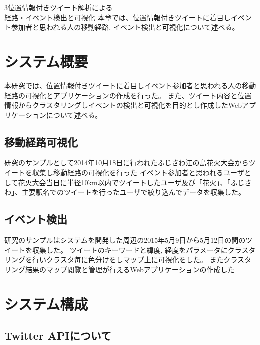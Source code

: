 \chapterhead
{3}{位置情報付きツイート解析による\\
経路・イベント検出と可視化}
{本章では、位置情報付きツイートに着目しイベント参加者と思われる人の移動経路, イベント検出と可視化について述べる。}


\section{システム概要}
本研究では、位置情報付きツイートに着目しイベント参加者と思われる人の移動経路の可視化とアプリケーションの作成を行った。
また、ツイート内容と位置情報からクラスタリングしイベントの検出と可視化を目的とし作成したWebアプリケーションについて述べる。

\subsection{移動経路可視化}
研究のサンプルとして2014年10月18日に行われたふじさわ江の島花火大会\cite{webpage_fujisawa}からツイートを収集し移動経路の可視化を行った
イベント参加者と思われるユーザとして花火大会当日に半径10km以内でツイートしたユーザ及び「花火」、「ふじさわ」、主要駅名でのツイートを行ったユーザで絞り込んでデータを収集した。


\subsection{イベント検出}
研究のサンプルはシステムを開発した周辺の2015年5月9日から5月12日の間のツイートを収集した。
ツイートのキーワードと緯度, 経度をパラメータにクラスタリングを行いクラスタ毎に色分けをしマップ上に可視化をした。
またクラスタリング結果のマップ閲覧と管理が行えるWebアプリケーションの作成した



\newpage

\section{システム構成}
\subsection{Twitter APIについて}
